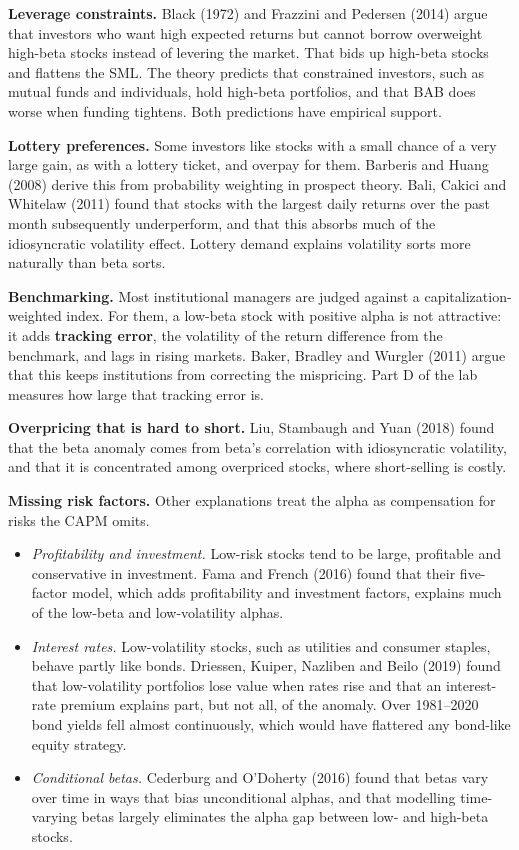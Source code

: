 \textbf{Leverage constraints.} Black (1972) and Frazzini and Pedersen (2014) argue that investors who want high expected returns but cannot borrow overweight high-beta stocks instead of levering the market. That bids up high-beta stocks and flattens the SML. The theory predicts that constrained investors, such as mutual funds and individuals, hold high-beta portfolios, and that BAB does worse when funding tightens. Both predictions have empirical support.

\textbf{Lottery preferences.} Some investors like stocks with a small chance of a very large gain, as with a lottery ticket, and overpay for them. Barberis and Huang (2008) derive this from probability weighting in prospect theory. Bali, Cakici and Whitelaw (2011) found that stocks with the largest daily returns over the past month subsequently underperform, and that this absorbs much of the idiosyncratic volatility effect. Lottery demand explains volatility sorts more naturally than beta sorts.

\textbf{Benchmarking.} Most institutional managers are judged against a capitalization-weighted index. For them, a low-beta stock with positive alpha is not attractive: it adds \textbf{tracking error}, the volatility of the return difference from the benchmark, and lags in rising markets. Baker, Bradley and Wurgler (2011) argue that this keeps institutions from correcting the mispricing. Part D of the lab measures how large that tracking error is.

\textbf{Overpricing that is hard to short.} Liu, Stambaugh and Yuan (2018) found that the beta anomaly comes from beta's correlation with idiosyncratic volatility, and that it is concentrated among overpriced stocks, where short-selling is costly.

\textbf{Missing risk factors.} Other explanations treat the alpha as compensation for risks the CAPM omits.

\begin{itemize}
  \item \emph{Profitability and investment.} Low-risk stocks tend to be large, profitable and conservative in investment. Fama and French (2016) found that their five-factor model, which adds profitability and investment factors, explains much of the low-beta and low-volatility alphas.
  \item \emph{Interest rates.} Low-volatility stocks, such as utilities and consumer staples, behave partly like bonds. Driessen, Kuiper, Nazliben and Beilo (2019) found that low-volatility portfolios lose value when rates rise and that an interest-rate premium explains part, but not all, of the anomaly. Over 1981--2020 bond yields fell almost continuously, which would have flattered any bond-like equity strategy.
  \item \emph{Conditional betas.} Cederburg and O'Doherty (2016) found that betas vary over time in ways that bias unconditional alphas, and that modelling time-varying betas largely eliminates the alpha gap between low- and high-beta stocks.
\end{itemize}

